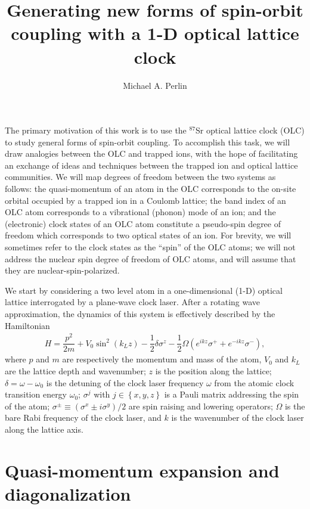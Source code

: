 \documentclass[aps,notitlepage,nofootinbib,11pt]{revtex4-1}
\newcommand{\f}[2]{\dfrac{#1}{#2}} %
\newcommand{\p}[1]{\left(#1\right)} %
\renewcommand{\set}[1]{\left\{#1\right\}} %
\newcommand{\1}{\mathds{1}}
\begin{document}
\title{Generating new forms of spin-orbit coupling with a 1-D optical
  lattice clock}

\author{Michael A. Perlin}

\maketitle
\thispagestyle{fancy}


The primary motivation of this work is to use the ${}^{87}$Sr optical
lattice clock (OLC) to study general forms of spin-orbit coupling.  To
accomplish this task, we will draw analogies between the OLC and
trapped ions, with the hope of facilitating an exchange of ideas and
techniques between the trapped ion and optical lattice communities.
We will map degrees of freedom between the two systems as follows: the
quasi-momentum of an atom in the OLC corresponds to the on-site
orbital occupied by a trapped ion in a Coulomb lattice; the band index
of an OLC atom corresponds to a vibrational (phonon) mode of an ion;
and the (electronic) clock states of an OLC atom constitute a
pseudo-spin degree of freedom which corresponds to two optical states
of an ion.  For brevity, we will sometimes refer to the clock states
as the ``spin'' of the OLC atoms; we will not address the nuclear spin
degree of freedom of OLC atoms, and will assume that they are
nuclear-spin-polarized.

We start by considering a two level atom in a one-dimensional (1-D)
optical lattice interrogated by a plane-wave clock laser.  After a
rotating wave approximation, the dynamics of this system is
effectively described by the Hamiltonian
\begin{align}
  H
  = \f{p^2}{2m} + V_0\sin^2\p{k_L z} - \f12\delta\sigma^z
  - \f12\Omega\p{e^{ikz}\sigma^+ + e^{-ikz}\sigma^-},
  \label{eq:start}
\end{align}
where $p$ and $m$ are respectively the momentum and mass of the atom,
$V_0$ and $k_L$ are the lattice depth and wavenumber; $z$ is the
position along the lattice; $\delta=\omega-\omega_0$ is the detuning
of the clock laser frequency $\omega$ from the atomic clock transition
energy $\omega_0$; $\sigma^j$ with $j\in\set{x,y,z}$ is a Pauli matrix
addressing the spin of the atom;
$\sigma^\pm\equiv\p{\sigma^x\pm i\sigma^y}/2$ are spin raising and
lowering operators; $\Omega$ is the bare Rabi frequency of the clock
laser, and $k$ is the wavenumber of the clock laser along the lattice
axis.


\section{Quasi-momentum expansion and diagonalization}
\end{document}
